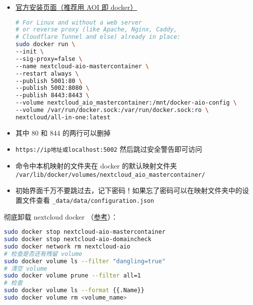 
\begin{itemize}
\item \href{https://nextcloud.com/install/}{官方安装页面（推荐用 AOI 即 docker）}
\begin{lstlisting}[language=bash]
# For Linux and without a web server
# or reverse proxy (like Apache, Nginx, Caddy,
# Cloudflare Tunnel and else) already in place:
sudo docker run \
--init \
--sig-proxy=false \
--name nextcloud-aio-mastercontainer \
--restart always \
--publish 5001:80 \
--publish 5002:8080 \
--publish 8443:8443 \
--volume nextcloud_aio_mastercontainer:/mnt/docker-aio-config \
--volume /var/run/docker.sock:/var/run/docker.sock:ro \
nextcloud/all-in-one:latest
\end{lstlisting}
\item 其中 80 和 844 的两行可以删掉
\item \verb`https://ip地址或localhost:5002` 然后跳过安全警告即可访问
\item 命令中本机映射的文件夹在 docker 的默认映射文件夹 \verb`/var/lib/docker/volumes/nextcloud_aio_mastercontainer/`
\item 初始界面千万不要跳过去，记下密码！如果忘了密码可以在映射文件夹中的设置文件查看 \verb`_data/data/configuration.json`
\end{itemize}

彻底卸载 nextcloud docker （\href{https://github.com/nextcloud/all-in-one#how-to-properly-reset-the-instance}{参考}）：
\begin{lstlisting}[language=bash]
sudo docker stop nextcloud-aio-mastercontainer
sudo docker stop nextcloud-aio-domaincheck
sudo docker network rm nextcloud-aio
# 检查是否还有残留 volume
sudo docker volume ls --filter "dangling=true"
# 清空 volume
sudo docker volume prune --filter all=1
# 检查
sudo docker volume ls --format {{.Name}}
sudo docker volume rm <volume_name>
\end{lstlisting}
